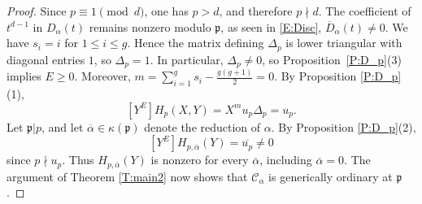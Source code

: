 \documentclass{amsart}
\theoremstyle{plain}
\theoremstyle{remark}
\theoremstyle{remark}
\newcommand{\fp}{\mathfrak{p}}
\newcommand{\cC}{\mathcal{C}}
\renewcommand{\bar}{\overline}
\newcommand{\0}{\mathbf{0}}
\newcommand{\1}{\mathbf{1}}
\begin{document}
\begin{proof}
Since $p\equiv 1\pmod d$, one has $p>d$, and therefore $p\nmid d$.
The coefficient of $t^{d-1}$ in $D_\alpha(t)$ remains nonzero modulo $\fp$, as seen in 
\eqref{E:Disc}, $\bar{D}_\alpha(t)\ne 0$.
We have $s_i=i$ for $1\le i\le g$.
Hence the matrix defining $\Delta_p$ is lower triangular with diagonal
entries $1$, so $\Delta_p=1$. 
In particular, $\Delta_p\neq 0$, so
Proposition~\ref{P:D_p}(3) implies $E\ge 0$. 
Moreover, 
$m=\sum_{i=1}^g s_i-\frac{g(g+1)}{2}=0$.
By Proposition \ref{P:D_p}(1),
$$
[Y^E]H_{p}(X,Y)=X^mu_p\Delta_p=u_p. 
$$
Let $\fp|p$, and let $\bar\alpha\in \kappa(\fp)$ denote
the reduction of $\alpha$. By Proposition \ref{P:D_p}(2),
$$
[Y^E]H_{p,\bar{\alpha}}(Y)=\bar{u_p}\ne 0$$
since $p\nmid u_p$.
Thus $H_{p,\bar\alpha}(Y)$ is nonzero for every $\bar\alpha$,
including $\bar\alpha=0$.
The argument of Theorem \ref{T:main2} 
now shows that $\cC_\alpha$ is generically ordinary at $\fp$.
\end{proof}
\end{document}
